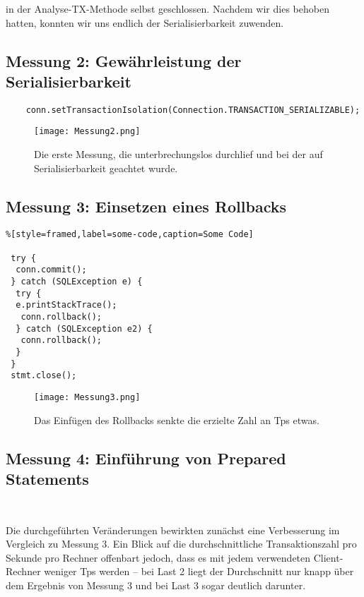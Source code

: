\documentclass[a4paper, bibliography=totoc, 12pt]{scrartcl}
\begin{document}
\noindent
in der Analyse-TX-Methode selbst geschlossen.	
	Nachdem wir dies behoben hatten, konnten wir uns endlich der Serialisierbarkeit zuwenden.
	\subsection{Messung 2: Gewährleistung der Serialisierbarkeit}

	\begin{lstlisting}
	conn.setTransactionIsolation(Connection.TRANSACTION_SERIALIZABLE);	
	\end{lstlisting}	
	
	
	
	\begin{figure}[h]
	\texttt{[image: Messung2.png]}
	\caption{Die erste Messung, die unterbrechungslos durchlief und bei der auf Serialisierbarkeit geachtet wurde.}
	\end{figure}
	
	\subsection{Messung 3: Einsetzen eines Rollbacks}

	\begin{lstlisting}%[style=framed,label=some-code,caption=Some Code]
	
 try {
  conn.commit();
 } catch (SQLException e) {
  try {
  e.printStackTrace();
   conn.rollback();
  } catch (SQLException e2) {
   conn.rollback();
  }
 }
 stmt.close();
	\end{lstlisting}

	\begin{figure}[h]
	\texttt{[image: Messung3.png]}
	\caption{Das Einfügen des Rollbacks senkte die erzielte Zahl an Tps etwas.}
	\end{figure}	
	
	\subsection{Messung 4: Einführung von Prepared Statements}

	\begin{lstlisting}
	
	\end{lstlisting}
	
	\noindent
	Die durchgeführten Veränderungen bewirkten zunächst eine Verbesserung im Vergleich zu Messung 3. Ein Blick auf die durchschnittliche Transaktionszahl pro Sekunde pro Rechner offenbart jedoch, dass es mit jedem verwendeten Client-Rechner weniger Tps werden -- bei Last 2 liegt der Durchschnitt nur knapp über dem Ergebnis von Messung 3 und bei Last 3 sogar deutlich darunter.
	
\end{document}
